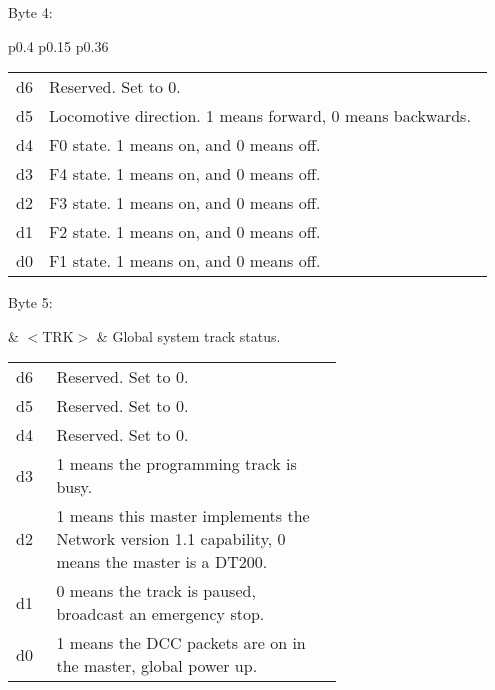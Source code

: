 Byte 4:

\begin{tabular}{p{0.4\linewidth} p{0.15\linewidth} p{0.36\linewidth}} 

\begin{tabular}{|p{0.3cm}|p{0.3cm}|p{0.3cm}|p{0.3cm}|p{0.3cm}|p{0.3cm}|p{0.3cm}|p{0.3cm}|}
\hline
0 & d6 & d5 & d4 & d3 & d2 & d1 & d0\\
\hline
\end{tabular}
& $<$DIRF$>$ & Locomotive direction and state of functions F0 to F4.\\
\end{tabular}

\begin{tabular}{p{0.05\linewidth} p{0.95\linewidth}} 
d6 & Reserved. Set to 0.\\
d5 & Locomotive direction. 1 means forward, 0 means backwards.\\
d4 & F0 state. 1 means on, and 0 means off.\\
d3 & F4 state. 1 means on, and 0 means off.\\
d2 & F3 state. 1 means on, and 0 means off.\\
d1 & F2 state. 1 means on, and 0 means off.\\
d0 & F1 state. 1 means on, and 0 means off.\\
\end{tabular}

Byte 5:

& $<$TRK$>$ & Global system track status.\\
\end{tabular}

\begin{tabular}{p{0.05\linewidth} p{0.6\linewidth}} 
d6 & Reserved. Set to 0.\\
d5 & Reserved. Set to 0.\\
d4 & Reserved. Set to 0.\\
d3 & 1 means the programming track is busy.\\
d2 & 1 means this master implements the Network version 1.1 capability,  0 means the master is a DT200.\\
d1 & 0 means the track is paused, broadcast an emergency stop.\\
d0 & 1 means the DCC packets are on in the master, global power up.\\
\end{tabular}

